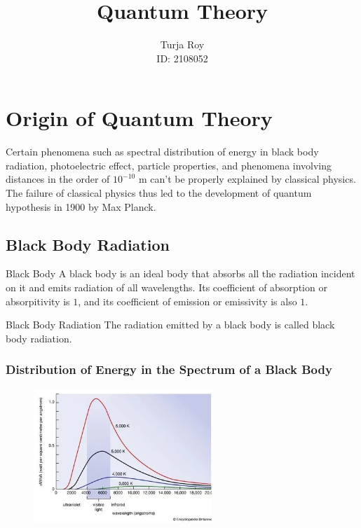 \documentclass[12pt]{article}
\title{
    \textbf{Quantum Theory}
}
\author{
    Turja Roy \\
    ID: 2108052
}
\date{}
\numberwithin{equation}{subsection}
\begin{document}
\maketitle
\tableofcontents
\newpage


\section{Origin of Quantum Theory}
Certain phenomena such as spectral distribution of energy in black body radiation, photoelectric effect, particle properties, and phenomena involving distances in the order of $10^{-10}$ m can't be properly explained by classical physics. The failure of classical physics thus led to the development of quantum hypothesis in 1900 by Max Planck.

\subsection{Black Body Radiation}
\begin{definition}{Black Body}{}
    A black body is an ideal body that absorbs all the radiation incident on it and emits radiation of all wavelengths. Its coefficient of absorption or absorpitivity is $1$, and its coefficient of emission or emissivity is also $1$.
\end{definition}

\begin{definition}{Black Body Radiation}{}
    The radiation emitted by a black body is called black body radiation.
\end{definition}

\subsubsection{Distribution of Energy in the Spectrum of a Black Body}
\begin{figure}[htpb]
    \centering
    \includegraphics[width=0.6\textwidth]{bb_radiation_distribution.png}
\end{figure}
\end{document}
